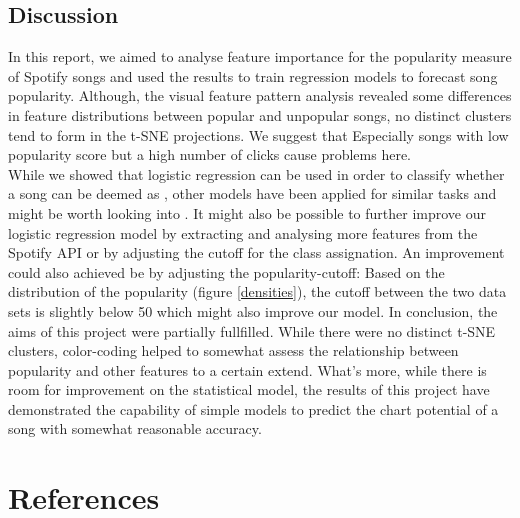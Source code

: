 \documentclass{article}
\begin{document}
\subsection{Discussion}
In this report, we aimed to analyse feature importance for the popularity measure of Spotify songs and used the results to train regression models to forecast song popularity.
Although, the visual feature pattern analysis revealed some differences in feature distributions between popular and unpopular songs, no distinct clusters tend to form in the t-SNE projections. We suggest that Especially songs with low popularity score but a high number of clicks cause problems here.\\
While we showed that logistic regression can be used in order to classify whether a song can be deemed as , other models have been applied for similar tasks and might be worth looking into \cite{araujo2020model}. 
It might also be possible to further improve our logistic regression model by extracting and analysing more features from the Spotify API or by adjusting the cutoff for the class assignation. 
An improvement could also achieved be by adjusting the popularity-cutoff: Based on the distribution of the popularity (figure \ref{densities}), the cutoff between the two data sets is slightly below 50 which might also improve our model. 
In conclusion, the aims of this project were partially fullfilled.
While there were no distinct t-SNE clusters, color-coding helped to somewhat assess the relationship between popularity and other features to a certain extend. What's more, while there is room for improvement on the statistical model, the results of this project have demonstrated the capability of simple models to predict the chart potential of a song with somewhat reasonable accuracy.

\section*{References}
\printbibliography[heading=none]


\newpage
\end{document}
